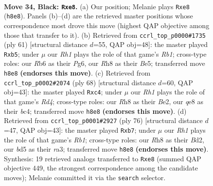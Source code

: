 \documentclass[11pt]{article}
\begin{document}
\clearpage

\begin{figure}[p]\centering
\begin{subfigure}{0.46\textwidth}\centering
\resizebox{\linewidth}{!}{%
\newchessgame
\chessboard[
  setfen={2b1Q2r/p7/Pr1p1p1k/2pB4/2P5/6P1/4N2K/R4R2 b - - 0 34},
  showmover=false,
  pgfstyle=straightmove, color=movearrow, markmove={h8-e8}
]}
\caption{}
\end{subfigure}\hfill
\begin{subfigure}{0.46\textwidth}\centering
\resizebox{\linewidth}{!}{%
\newchessgame
\chessboard[
  setfen={1r4k1/5p2/6pp/1Q2b3/p6P/5PN1/PPR2P2/6K1 b - - 0 31},
  showmover=false,
  pgfstyle=straightmove, color=movearrow, markmove={b8-b5}
]}
\caption{}
\end{subfigure}
\\[4pt]
\begin{subfigure}{0.46\textwidth}\centering
\resizebox{\linewidth}{!}{%
\newchessgame
\chessboard[
  setfen={8/2r3k1/p4n1p/6p1/2bRp3/Pr6/1P2B1PP/4R1K1 w - - 0 35},
  showmover=false,
  pgfstyle=straightmove, color=movearrow, markmove={d4-c4}
]}
\caption{}
\end{subfigure}\hfill
\begin{subfigure}{0.46\textwidth}\centering
\resizebox{\linewidth}{!}{%
\newchessgame
\chessboard[
  setfen={5bk1/1q3p2/6pp/p3P3/3P4/r1nB2P1/3B3P/1R4K1 w - - 0 39},
  showmover=false,
  pgfstyle=straightmove, color=movearrow, markmove={b1-b7}
]}
\caption{}
\end{subfigure}
\caption{\textbf{Move 34, Black: \texttt{Rxe8}.} (a) Our position; Melanie plays \texttt{Rxe8} (\texttt{h8e8}). Panels (b)--(d) are the retrieved master positions whose correspondence most drove this move (highest QAP objective among those that transfer to it). (b) Retrieved from \texttt{ccrl\_top\_p0000\#1735} (ply 61) [structural distance $d$=55, QAP obj=48]: the master played \texttt{Rxb5}; under $\mu$ our \emph{Rh1} plays the role of that game's \emph{Rb1}; cross-type roles: our \emph{R}b6 as their \emph{P}g6, our \emph{R}h8 as their \emph{B}e5; transferred move \texttt{h8e8} \textbf{(endorses this move)}. (c) Retrieved from \texttt{ccrl\_top\_p0002\#2074} (ply 68) [structural distance $d$=60, QAP obj=43]: the master played \texttt{Rxc4}; under $\mu$ our \emph{Rh1} plays the role of that game's \emph{Rd4}; cross-type roles: our \emph{R}h8 as their \emph{B}e2, our \emph{q}e8 as their \emph{b}c4; transferred move \texttt{h8e8} \textbf{(endorses this move)}. (d) Retrieved from \texttt{ccrl\_top\_p0001\#2927} (ply 76) [structural distance $d$=47, QAP obj=43]: the master played \texttt{Rxb7}; under $\mu$ our \emph{Rh1} plays the role of that game's \emph{Rb1}; cross-type roles: our \emph{R}h8 as their \emph{B}d2, our \emph{b}d5 as their \emph{r}a3; transferred move \texttt{h8e8} \textbf{(endorses this move)}. Synthesis: 19 retrieved analogs transferred to \texttt{Rxe8} (summed QAP objective 449, the strongest correspondence among the candidate moves); Melanie committed it via the \texttt{search} selector.}
\label{fig:thought-m67}
\end{figure}
\end{document}
